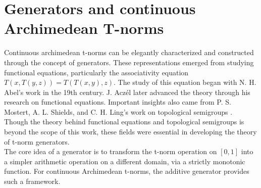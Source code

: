 
\section{Generators and continuous Archimedean T-norms}
\label{app:generators_tnorms}
Continuous archimedean t-norms can be elegantly characterized and constructed through the concept of generators. 
These representations emerged from studying functional equations, particularly the associativity equation
 $T(x, T(y,z)) = T(T(x,y),z)$. The study of this equation began with N. H. Abel's work in the 19th century. J. Aczél later advanced the theory through his research on functional equations. Important insights also came from P. S. Mostert, A. L. Shields, and C. H. Ling's work on topological semigroups \cite[Sec.~5.1]{Klement2000}. Though the theory behind functional equations and topological semigroups is beyond the scope of this work, these fields were essential in developing the theory of t-norm generators.\\

The core idea of a generator is to transform the t-norm operation on $[0,1]$ into a simpler arithmetic operation on a different domain, via a strictly monotonic function. For continuous Archimedean t-norms, the additive generator provides such a framework.

